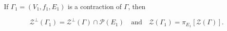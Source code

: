 If $\Gamma_1 = (V_1, f_1, E_1)$ is a contraction of $\Gamma$, then

$$\mathcal{Z}^\perp(\Gamma_1) = \mathcal{Z}^\perp(\Gamma) \cap \mathcal{P}(E_1) \quad \text{and} \quad \mathcal{Z}(\Gamma_1) = \pi_{E_1}[\mathcal{Z}(\Gamma)].$$
